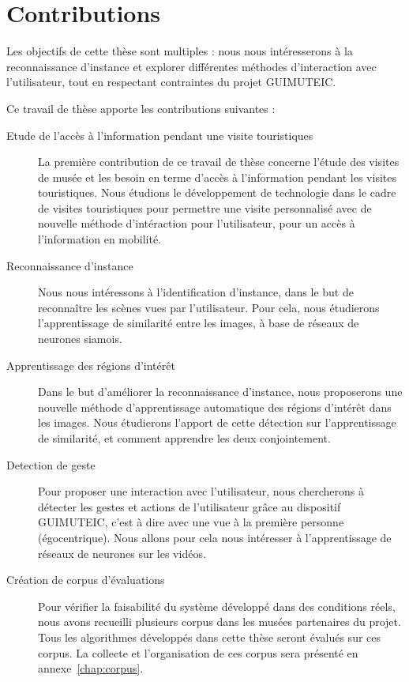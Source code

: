 \section{Contributions}

Les objectifs de cette thèse sont multiples : nous nous intéresserons à la reconnaissance d'instance et explorer différentes méthodes d'interaction avec l'utilisateur, tout en respectant contraintes du projet GUIMUTEIC. 


Ce travail de thèse apporte les contributions suivantes :
\begin{description}
	\item[Etude de l'accès à l'information pendant une visite touristiques] La première contribution de ce travail de thèse concerne l'étude des visites de musée et les besoin en terme d'accès à l'information pendant les visites touristiques. 
Nous étudions le développement de technologie dans le cadre de visites touristiques pour permettre une visite personnalisé avec de nouvelle méthode d'intéraction pour l'utilisateur, pour un accès à l'information en mobilité. 
	\item[Reconnaissance d'instance] Nous nous intéressons à l'identification d'instance, dans le but de reconnaître les scènes vues par l'utilisateur. Pour cela, nous étudierons l'apprentissage de similarité entre les images, à base de réseaux de neurones siamois.
	\item[Apprentissage des régions d'intérêt] Dans le but d'améliorer la reconnaissance d'instance, nous proposerons une nouvelle méthode d'apprentissage automatique des régions d'intérêt dans les images. Nous étudierons l'apport de cette détection sur l'apprentissage de similarité, et comment apprendre les deux conjointement.
	\item[Detection de geste] Pour proposer une interaction avec l'utilisateur, nous chercherons à détecter les gestes et actions de l'utilisateur grâce au dispositif GUIMUTEIC, c'est à dire avec une vue à la première personne (égocentrique). Nous allons pour cela nous intéresser à l'apprentissage de réseaux de neurones sur les vidéos.
	\item[Création de corpus d'évaluations] Pour vérifier la faisabilité du système développé dans des conditions réels, nous avons recueilli plusieurs corpus dans les musées partenaires du projet. Tous les algorithmes développés dans cette thèse seront évalués sur ces corpus. La collecte et l'organisation de ces corpus sera présenté en annexe~\ref{chap:corpus}.
\end{description}


